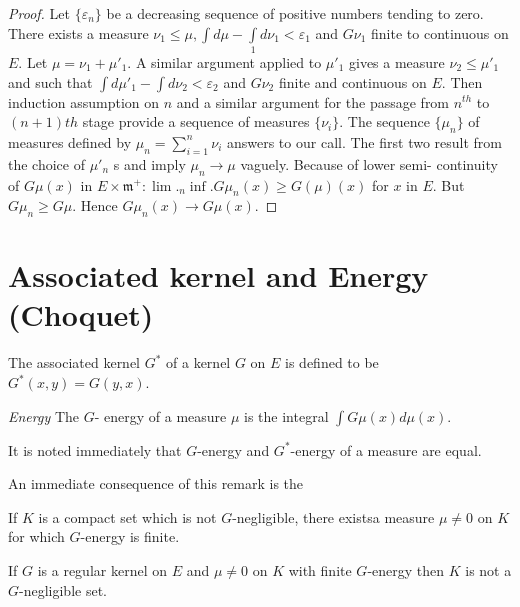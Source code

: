 \begin{proof}
  Let $\{ \varepsilon _n\}$ be a decreasing sequence of positive numbers
  tending to zero. There exists a measure $\nu_1 \leq \mu,  \int  d
  \mu - \int \limits_1 d \nu_1 < \varepsilon _1$ and $G\nu _1$ finite to
  continuous on $E$. Let $\mu = \nu_1 + \mu'_1$. A similar argument
  applied to  $\mu'_1$ gives a measure $\nu_2  \leq \mu'_1$ and such
  that $\int d \mu' _1 - \int d \nu_2 < \varepsilon _2$ and $G \nu_2$
  finite and continuous on $E$. Then induction assumption on $n$ and
  a similar argument for the passage from $n^{th} $ to $( n + 1)th$
  stage provide a sequence of measures $\{\nu_i\}$. The sequence $\{
  \mu_n\}$ of measures defined by $\mu _n = \sum\limits_{i = 1}^n \nu
  _i $ answers to our call. The first two result from the choice of
  $\mu' _n$ s and imply $\mu_n \to \mu$ vaguely. Because of lower
  semi- continuity of $G \mu (x)$ in $E \times \mathfrak{m}^+ : \lim
  ._{n} \inf . G\mu_n (x) \geq G(\mu)(x)$ for $x$ in $E$. But $G\mu
  _n \geq G \mu$. Hence $G\mu_n (x) \to G\mu(x)$.  
\end{proof}

\section{Associated kernel and Energy (Choquet)}\label{p3:chap2:sec5}

\begin{defn}\label{p3:chap2:sec5:def7} %
  The associated kernel $G^*$ of a kernel $G$ on $E$ is defined to be
  $G^* (x, y) =G (y, x )$.  
\end{defn}

\begin{defn}\label{p3:chap2:sec5:def8} %
  {\em Energy} The $G$- energy of a measure $\mu$ is the integral
  $\int G \mu (x) d \mu (x)$.  

  It is noted immediately that $G$-energy and $G^*$-energy of a
  measure are equal.  

  An immediate consequence of this remark is the 
\end{defn}

\begin{prop}\label{p3:chap2:sec5:prop5} %
  If $K$ is a compact set which is not $G$-negligible, there exists\pageoriginale a
  measure $\mu \neq 0$ on $K$ for which $G$-energy is finite.  
\end{prop}

\begin{prop}\label{p3:chap2:sec5:prop6} %
  If $G$ is a regular kernel on $E$ and $\mu \neq 0$ on $K$ with
  finite $G$-energy then $K$ is not a $G$-negligible set. 
\end{prop}

